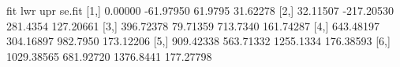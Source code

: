 \begin{Schunk}
\begin{Soutput}
            fit        lwr       upr    se.fit
[1,]    0.00000  -61.97950   61.9795  31.62278
[2,]   32.11507 -217.20530  281.4354 127.20661
[3,]  396.72378   79.71359  713.7340 161.74287
[4,]  643.48197  304.16897  982.7950 173.12206
[5,]  909.42338  563.71332 1255.1334 176.38593
[6,] 1029.38565  681.92720 1376.8441 177.27798
\end{Soutput}
\end{Schunk}
